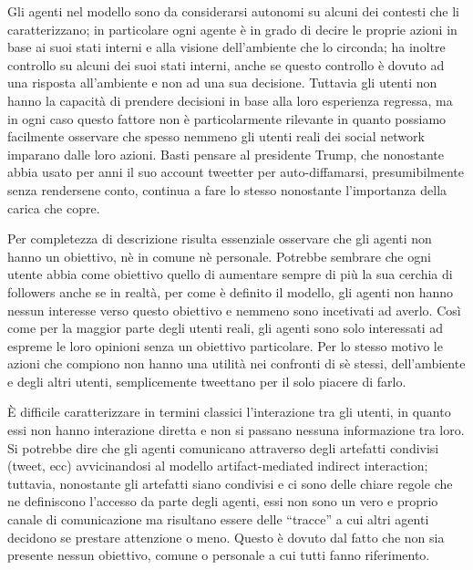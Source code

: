\documentclass[a4paper,12pt]{article}
\begin{document}
Gli agenti nel modello sono da considerarsi autonomi su alcuni dei contesti che li caratterizzano; in particolare ogni agente \`e in grado di decire le proprie azioni in base ai suoi stati interni e alla visione dell'ambiente che lo circonda; ha inoltre controllo su alcuni dei suoi stati interni, anche se questo controllo \`e dovuto ad una risposta all'ambiente e non ad una sua decisione. Tuttavia gli utenti non hanno la capacit\`a di prendere decisioni in base alla loro esperienza regressa, ma in ogni caso questo fattore non \`e particolarmente rilevante in quanto possiamo facilmente osservare che spesso nemmeno gli utenti reali dei social network imparano dalle loro azioni. Basti pensare al presidente Trump, che nonostante abbia usato per anni il suo account tweetter per auto-diffamarsi, presumibilmente senza rendersene conto, continua a fare lo stesso nonostante l'importanza della carica che copre.

Per completezza di descrizione risulta essenziale osservare che gli agenti non hanno un obiettivo, n\`e in comune n\`e personale. Potrebbe sembrare che ogni utente abbia come obiettivo quello di aumentare sempre di pi\`u la sua cerchia di followers anche se in realt\`a, per come \`e definito il modello, gli agenti non hanno nessun interesse verso questo obiettivo e nemmeno sono incetivati ad averlo. Cos\`i come per la maggior parte degli utenti reali, gli agenti sono solo interessati ad espreme le loro opinioni senza un obiettivo particolare. Per lo stesso motivo le azioni che compiono non hanno una utilit\`a nei confronti di s\`e stessi, dell'ambiente e degli altri utenti, semplicemente tweettano per il solo piacere di farlo.

\`E difficile caratterizzare in termini classici l'interazione tra gli utenti, in quanto essi non hanno interazione diretta e non si passano nessuna informazione tra loro. Si potrebbe dire che gli agenti comunicano attraverso degli artefatti condivisi (tweet, ecc) avvicinandosi al modello artifact-mediated indirect interaction; tuttavia, nonostante gli artefatti siano condivisi e ci sono delle chiare regole che ne definiscono l'accesso da parte degli agenti, essi non sono un vero e proprio canale di comunicazione ma risultano essere delle ``tracce'' a cui altri agenti decidono se prestare attenzione o meno. Questo \`e dovuto dal fatto che non sia presente nessun obiettivo, comune o personale a cui tutti fanno riferimento.
\end{document}
